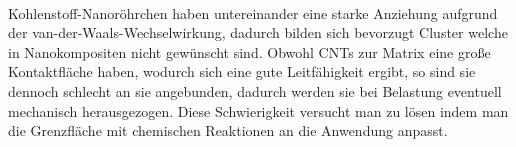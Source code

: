 \documentclass[11pt,a4paper]{article}
\numberwithin{equation}{section}
\numberwithin{figure}{section}
\begin{document}
\\
\begin{addmargin}[25pt]{0pt}
Kohlenstoff-Nanoröhrchen haben untereinander eine starke Anziehung aufgrund der van-der-Waals-Wechselwirkung, dadurch bilden sich bevorzugt Cluster welche in Nanokompositen nicht gewünscht sind. Obwohl CNTs zur Matrix eine große Kontaktfläche haben, wodurch sich eine gute Leitfähigkeit ergibt, so sind sie dennoch schlecht an sie angebunden, dadurch werden sie bei Belastung eventuell mechanisch herausgezogen. Diese Schwierigkeit versucht man zu lösen indem man die Grenzfläche mit chemischen Reaktionen an die Anwendung anpasst.  \\
\end{addmargin}
\end{document}
